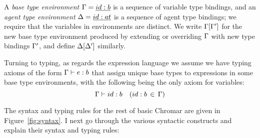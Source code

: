 A \emph{base type environment} $\Gamma = \underline{id:b}$ is a sequence of variable type
bindings, and an \emph{agent type environment} $\Delta = \underline{id:at}$ is a sequence of
agent type bindings; we require that the variables in environments are distinct.
We write $\Gamma[\Gamma']$ for the new base type environment produced by extending or
overriding $\Gamma$ with new type bindings $\Gamma'$, and define $\Delta[\Delta']$ similarly.

Turning to typing, as regards the expression language we assume we have typing
axioms of the form $\Gamma \vdash e : b$ that assign unique base types to expressions in
some base type environments, with the following being the only axiom for
variables:
 \[\Gamma \vdash id:b  \quad (id:b \, \in \, \Gamma)\]

 The syntax and typing rules for the rest of basic Chromar are given in
 Figure~\ref{fig:syntax}. I next go through the various syntactic constructs
 and explain their syntax and typing rules:

